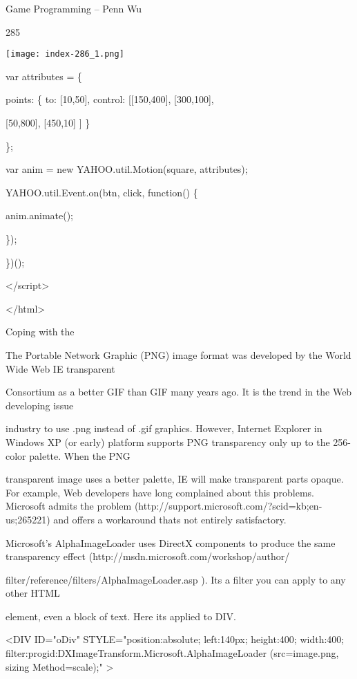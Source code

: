 \documentclass[
]{article}
\begin{document}
Game Programming -- Penn Wu

285

\protect\hypertarget{index_split_015.htmlux5cux23p286}{}{}\texttt{[image: index-286\_1.png]}

var attributes = \{

points: \{ to: {[}10,50{]}, control: {[}{[}150,400{]}, {[}300,100{]},

{[}50,800{]}, {[}450,10{]} {]} \}

\};

var anim = new
YAHOO.util.Motion(\textquotesingle square\textquotesingle, attributes);

YAHOO.util.Event.on(\textquotesingle btn\textquotesingle,
\textquotesingle click\textquotesingle, function() \{

anim.animate();

\});

\})();

\textless/script\textgreater{}

\textless/html\textgreater{}

Coping with the

The Portable Network Graphic (PNG) image format was developed by the
World Wide Web IE transparent

Consortium as a better GIF than GIF many years ago. It is the trend in
the Web developing issue

industry to use .png instead of .gif graphics. However, Internet
Explorer in Windows XP (or early) platform supports PNG transparency
only up to the 256-color palette. When the PNG

transparent image uses a better palette, IE will make transparent parts
opaque. For example, Web developers have long complained about this
problems. Microsoft admits the problem
(http://support.microsoft.com/?scid=kb;en-us;265221) and offers a
workaround that\textquotesingle s not entirely satisfactory.

Microsoft's AlphaImageLoader uses DirectX components to produce the same
transparency effect (http://msdn.microsoft.com/workshop/author/

filter/reference/filters/AlphaImageLoader.asp ). It\textquotesingle s a
filter you can apply to any other HTML

element, even a block of text. Here it\textquotesingle s applied to DIV.

\textless DIV ID="oDiv" STYLE="position:absolute; left:140px;
height:400; width:400;
filter:progid:DXImageTransform.Microsoft.AlphaImageLoader
(src=\textquotesingle image.png\textquotesingle, sizing
Method=\textquotesingle scale\textquotesingle);" \textgreater{}
\end{document}
